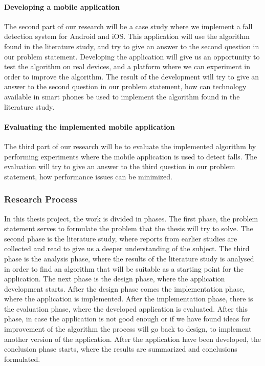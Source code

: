 \documentclass[12pt, a4paper, onecolumn]{article}
\begin{document}
\paragraph{Developing a mobile application}
The second part of our research will be a case study where we implement a fall detection system for Android and iOS. This application will use the algorithm found in the literature study, and try to give an answer to the second question in our problem statement. Developing the application will give us an opportunity to test the algorithm on real devices, and a platform where we can experiment in order to improve the algorithm. The result of the development will try to give an answer to the second question in our problem statement, how can technology available in smart phones be used to implement the algorithm found in the literature study.

\paragraph{Evaluating the implemented mobile application}

The third part of our research will be to evaluate the implemented algorithm by performing experiments where the mobile application is used to detect falls. The evaluation will try to give an answer to the third question in our problem statement, how performance issues can be minimized.

\subsubsection{Research Process}

In this thesis project, the work is divided in phases. The first phase, the problem statement serves to formulate the problem that the thesis will try to solve. The second phase is the literature study, where reports from earlier studies are collected and read to give us a deeper understanding of the subject. The third phase is the analysis phase, where the results of the literature study is analysed in order to find an algorithm that will be suitable as a starting point for the application. The next phase is the design phase, where the application development starts. After the design phase comes the implementation phase, where the application is implemented. After the implementation phase, there is the evaluation phase, where the developed application is evaluated. After this phase, in case the application is not good enough or if we have found ideas for improvement of the algorithm the process will go back to design, to implement another version of the application. After the application have been developed, the conclusion phase starts, where the results are summarized and conclusions formulated. 
\end{document}
